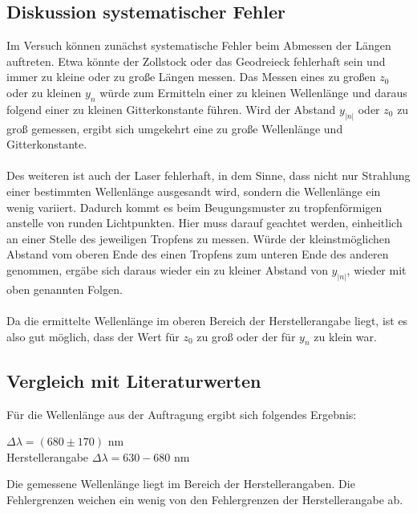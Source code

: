 \documentclass[12pt,a4paper,titlepage,headinclude,bibtotoc]{scrartcl}
\begin{document}
\subsection{Diskussion systematischer Fehler}
Im Versuch können zunächst systematische Fehler beim Abmessen der Längen auftreten. Etwa könnte der Zollstock oder das Geodreieck fehlerhaft sein und immer zu kleine oder zu große Längen messen. Das Messen eines zu großen $z_0$ oder zu kleinen $y_n$ würde zum Ermitteln einer zu kleinen Wellenlänge und daraus folgend einer zu kleinen Gitterkonstante führen. Wird der Abstand $y_{|n|}$ oder $z_0$ zu groß gemessen, ergibt sich umgekehrt eine zu große Wellenlänge und Gitterkonstante. \\\\
Des weiteren ist auch der Laser fehlerhaft, in dem Sinne, dass nicht nur Strahlung einer bestimmten Wellenlänge ausgesandt wird, sondern die Wellenlänge ein wenig variiert. Dadurch kommt es beim Beugungsmuster zu tropfenförmigen anstelle von runden Lichtpunkten. Hier muss darauf geachtet werden, einheitlich an einer Stelle des jeweiligen Tropfens zu messen. Würde der kleinstmöglichen Abstand vom oberen Ende des einen Tropfens zum unteren Ende des anderen genommen, ergäbe sich daraus wieder ein zu kleiner Abstand von $y_{|n|}$, wieder mit oben genannten Folgen.\\\\

Da die ermittelte Wellenlänge im oberen Bereich der Herstellerangabe liegt, ist es also gut möglich, dass der Wert für $z_0$ zu groß oder der für $y_n$ zu klein war.
  
\subsection{Vergleich mit Literaturwerten}

Für die Wellenlänge aus der Auftragung ergibt sich folgendes Ergebnis:\\
\begin{center}
$\Delta \lambda = (680 \pm 170)  $ nm\\
Herstellerangabe $ \Delta \lambda = 630-680 $ nm\\
\end{center}

Die gemessene Wellenlänge liegt im Bereich der Herstellerangaben. Die Fehlergrenzen weichen ein wenig von den Fehlergrenzen der Herstellerangabe ab.\\\\
\end{document}
